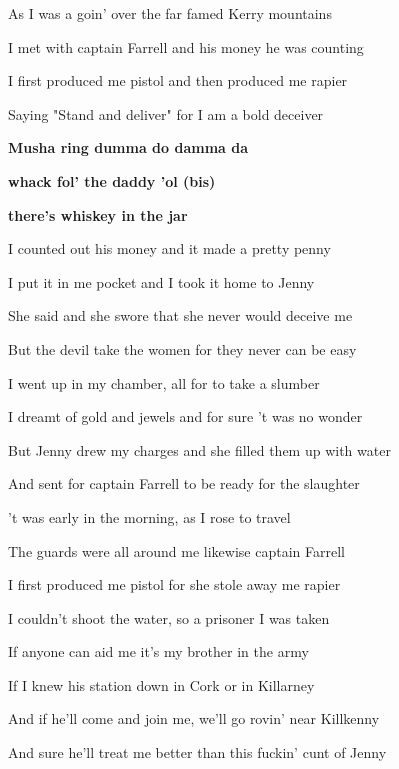 As I was a goin' over the far famed Kerry mountains

I met with captain Farrell and his money he was counting

I first produced me pistol and then produced me rapier

Saying "Stand and deliver" for I am a bold deceiver

\bigskip

\textbf{Musha ring dumma do damma da}

\textbf{whack fol' the daddy 'ol (bis)}

\textbf{there's whiskey in the jar}

\bigskip

I counted out his money and it made a pretty penny

I put it in me pocket and I took it home to Jenny

She said and she swore that she never would deceive me

But the devil take the women for they never can be easy

\bigskip

I went up in my chamber, all for to take a slumber

I dreamt of gold and jewels and for sure 't was no wonder

But Jenny drew my charges and she filled them up with water

And sent for captain Farrell to be ready for the slaughter

\bigskip

't was early in the morning, as I rose to travel

The guards were all around me likewise captain Farrell

I first produced me pistol for she stole away me rapier

I couldn't shoot the water, so a prisoner I was taken

\bigskip

If anyone can aid me it's my brother in the army

If I knew his station down in Cork or in Killarney

And if he'll come and join me, we'll go rovin' near Killkenny

And sure he'll treat me better than this fuckin' cunt of Jenny

